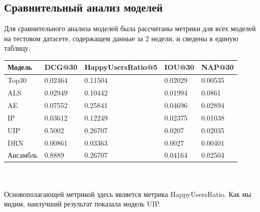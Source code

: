 \documentclass[14pt]{mmcs_article}
\begin{document}
\subsection{Сравнительный анализ моделей}
Для сравнительного анализа моделей была рассчитаны метрики для всех моделей на тестовом датасете, содержащем данные за 2 недели, и сведены в единую таблицу.\\
\begin{tabular}{| l |l| l| l| l|}
	\hline
	Модель & DCG@30 & HappyUsersRatio@5 & IOU@30 &  NAP@30 \\
	\hline
	Top30 & 0.02464 & 0.11504 & 0.02029 & 0.00535 \\
	\hline
	ALS & 0.02949 & 0.10442 & 0.01994 &  0.0861 \\
	\hline
	AE & 0.07552 & 0.25841 & 0.04696 &  0.02894 \\
	\hline
	IP & 0.03612 & 0.12249 & 0.02375 &  0.01038 \\
	\hline
	UIP & 0.5002 & 0.26707 & 0.0207 &  0.02035 \\
	\hline
	DRN & 0.00861 & 0.03363 & 0.0027 & 0.00401 \\
	\hline
	Ансамбль & 0.8889 & 0.26707 & 0.04164 &  0.02504 \\
	\hline
\end{tabular}\\ \\
Основополагающей метрикой здесь является метрика HappyUsersRatio.
Как мы видим, наилучший результат показала модель UIP.

\end{document}
